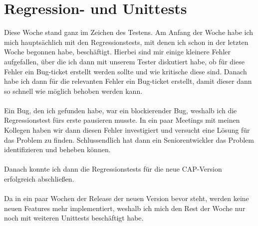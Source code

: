 \section{Regression- und Unittests}
Diese Woche stand ganz im Zeichen des Testens. Am Anfang der Woche habe ich mich hauptsächlich mit den Regressionstests, mit denen ich schon in der letzten Woche begonnen habe, beschäftigt. Hierbei sind mir einige kleinere Fehler aufgefallen, über die ich dann mit unserem Tester diskutiert habe, ob für diese Fehler ein Bug-ticket erstellt werden sollte und wie kritische diese sind. Danach habe ich dann für die relevanten Fehler ein Bug-ticket erstellt, damit dieser dann so schnell wie möglich behoben werden kann. \\\\
Ein Bug, den ich gefunden habe, war ein blockierender Bug, weshalb ich die Regressionstest fürs erste pausieren musste. In ein paar Meetings mit meinen Kollegen haben wir dann diesen Fehler investigiert und versucht eine Lösung für das Problem zu finden. Schlussendlich hat dann ein Seniorentwickler das Problem identifizieren und beheben können. \\\\
Danach konnte ich dann die Regressionstests für die neue CAP-Version erfolgreich abschließen. \\\\
Da in ein paar Wochen der Release der neuen Version bevor steht, werden keine neuen Features mehr implementiert, weshalb ich mich den Rest der Woche nur noch mit weiteren Unittests beschäftigt habe. \\\\

